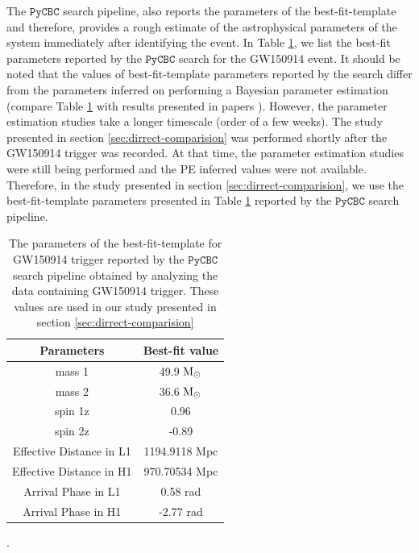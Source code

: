 The $\texttt{PyCBC}$ search pipeline, also reports the parameters of the best-fit-template and therefore, provides a rough estimate of the astrophysical parameters of the system immediately after identifying the event.  In Table \ref{tab:best-fitGW150914}, we list the best-fit parameters reported by the $\texttt{PyCBC}$ search for the GW150914 event. It should be noted that the values of best-fit-template parameters reported by the search differ from the parameters inferred on performing a Bayesian parameter estimation (compare Table \ref{tab:best-fitGW150914} with results presented in papers \cite{gw150914PE}). However, the parameter estimation studies take a longer timescale (order of a few weeks). The study presented in section \ref{sec:dirrect-comparision} was performed shortly after the GW150914 trigger was recorded. At that time, the parameter estimation studies were still being performed and the PE inferred values were not available. Therefore, in the study presented in section \ref{sec:dirrect-comparision}, we use the best-fit-template parameters presented in Table \ref{tab:best-fitGW150914} reported by the $\texttt{PyCBC}$ search pipeline.



\begin{table}
\centering
\begin{tabular}{|c|c| }
\hline
Parameters 		 & Best-fit value \\ \hline
mass 1                   & 49.9 $\mathrm{M}_\odot$       \\ 
mass 2                   & 36.6 $\mathrm{M}_\odot$         \\
spin 1z                  & 0.96          \\ 
spin 2z                  & -0.89         \\ \hline
Effective Distance in L1 & 1194.9118 Mpc \\ 
Effective Distance in H1 & 970.70534 Mpc \\  \hline
Arrival Phase in L1      & 0.58 rad      \\ 
Arrival Phase in H1      & -2.77 rad     \\ \hline
\end{tabular}
\caption{The parameters of the best-fit-template for GW150914 trigger reported by the $\texttt{PyCBC}$ search pipeline obtained by analyzing the data containing GW150914 trigger. These values are used in our study presented in section \ref{sec:dirrect-comparision}}.
\label{tab:best-fitGW150914}
\end{table}



